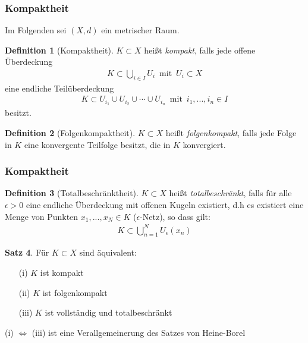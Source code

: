 \documentclass[t, handout]{beamer}
\theoremstyle{definition} %
\newtheorem{sa}{Satz}[section] %
\newtheorem{dfi}[sa]{Definition} %
\begin{document}
\begin{frame}
\frametitle{Kompaktheit}
Im Folgenden sei $(X,d)$ ein metrischer Raum.
\pause
\begin{dfi}[Kompaktheit]
$K \subset X$ heißt \textit{kompakt}, falls jede offene Überdeckung 
\begin{align*}
K \subset \bigcup_{i \in I}{U_i} \enspace \text{mit} \enspace U_i \subset X
\end{align*}
eine endliche Teilüberdeckung
\begin{align*}
K \subset U_{i_1} \cup  U_{i_2} \cup \cdots \cup U_{i_n}  \enspace \text{mit} \enspace i_1, ..., i_n \in I
\end{align*}
besitzt.
\end{dfi}
\pause
\begin{dfi}[Folgenkompaktheit]
$K \subset X$ heißt \textit{folgenkompakt}, falls jede Folge in $K$ eine konvergente Teilfolge besitzt, die in $K$ konvergiert.
\end{dfi}
\end{frame}

\begin{frame}
\frametitle{Kompaktheit}
\begin{dfi}[Totalbeschränktheit]
$K \subset X$ heißt \textit{totalbeschränkt}, falls für alle $\epsilon > 0$ eine endliche Überdeckung mit offenen Kugeln existiert, d.h es existiert eine Menge von Punkten $x_1, ..., x_N \in K$ ($\epsilon$-Netz), so dass gilt:
\begin{align*} 
K \subset \bigcup_{n=1}^{N}{U_\epsilon(x_n)}
\end{align*} 
\end{dfi}
\pause
\begin{sa}
\label{komp_eq}
Für $K \subset X$ sind äquivalent:
\begin{itemize}
\item[(i)] $K$ ist kompakt
\item[(ii)] $K$ ist folgenkompakt
\item[(iii)] $K$ ist vollständig und totalbeschränkt
\end{itemize}
\end{sa}
\pause
(i) $\Leftrightarrow$ (iii) ist eine Verallgemeinerung des Satzes von Heine-Borel
\end{frame}
\end{document}
